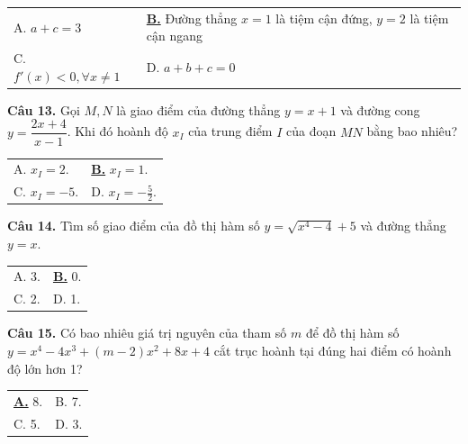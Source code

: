 \documentclass[12pt,a4paper]{article}
\makeatletter
\newcommand{\choiceA}[4]{

    \par\vspace{0.5em}\noindent

    \begin{tabularx}{\textwidth}{@{}X X@{}}

    \underline{\textbf{A.}} #1 & B. #2 \\[1.2em]

    C. #3 & D. #4

    \end{tabularx}

}
\newcommand{\choiceB}[4]{

    \par\vspace{0.5em}\noindent

    \begin{tabularx}{\textwidth}{@{}X X@{}}

    A. #1 & \underline{\textbf{B.}} #2 \\[1.2em]

    C. #3 & D. #4

    \end{tabularx}

}
\makeatother
\begin{document}
\begin{center}


\end{center}

\choiceB{$a + c = 3$}{Đường thẳng $x = 1$ là tiệm cận đứng, $y = 2$ là tiệm cận ngang}{$f'(x) < 0, \forall x \neq 1$}{$a + b + c = 0$}



\textbf{Câu 13.} Gọi $M, N$ là giao điểm của đường thẳng $y=x+1$ và đường cong $y=\dfrac{2x+4}{x-1}$. Khi đó hoành độ $x_I$ của trung điểm $I$ của đoạn $MN$ bằng bao nhiêu?

\choiceB{$x_I = 2$.}{$x_I = 1$.}{$x_I = -5$.}{$x_I = -\frac{5}{2}$.}



\textbf{Câu 14.} Tìm số giao điểm của đồ thị hàm số $y=\sqrt{x^4-4}+5$ và đường thẳng $y=x$.

\choiceB{3.}{0.}{2.}{1.}



\textbf{Câu 15.} Có bao nhiêu giá trị nguyên của tham số $m$ để đồ thị hàm số $y=x^4-4x^3+(m-2)x^2+8x+4$ cắt trục hoành tại đúng hai điểm có hoành độ lớn hơn 1?

\choiceA{8.}{7.}{5.}{3.}
\end{document}
